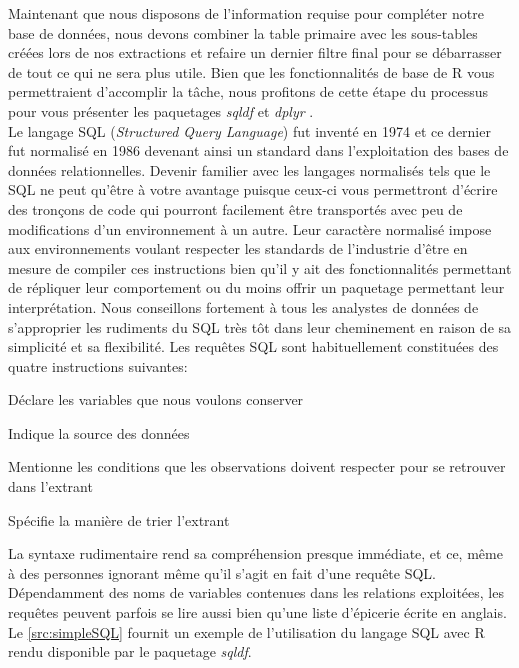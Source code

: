 \vspace{\baselineskip}
Maintenant que nous disposons de l'information requise pour compléter notre base de données, nous devons combiner la table primaire avec les sous-tables créées lors de nos extractions et refaire un dernier filtre final pour se débarrasser de tout ce qui ne sera plus utile. Bien que les fonctionnalités de base de R vous permettraient d'accomplir la tâche, nous profitons de cette étape du processus pour vous présenter les paquetages \emph{sqldf} \cite{Rpackage:sqldf} et \emph{dplyr} \cite{Rpackage:plyr}. \\

Le langage SQL (\emph{Structured Query Language}) fut inventé en 1974 et ce dernier fut normalisé en 1986 devenant ainsi un standard dans l'exploitation des bases de données relationnelles. Devenir familier avec les langages normalisés tels que le SQL ne peut qu'être à votre avantage puisque ceux-ci vous permettront d'écrire des tronçons de code qui pourront facilement être transportés avec peu de modifications d'un environnement à un autre. Leur caractère normalisé impose aux environnements voulant respecter les standards de l'industrie d'être en mesure de compiler ces instructions bien qu'il y ait des fonctionnalités permettant de répliquer leur comportement ou du moins offrir un paquetage permettant leur interprétation. \cite{SQL} Nous conseillons fortement à tous les analystes de données de s'approprier les rudiments du SQL très tôt dans leur cheminement en raison de sa simplicité et sa flexibilité. Les requêtes SQL sont habituellement constituées des quatre instructions suivantes: \\

\begin{description}[style=multiline,leftmargin=2cm]
	\item[Select] Déclare les variables que nous voulons conserver
	\item[From] Indique la source des données
	\item[Where] Mentionne les conditions que les observations doivent respecter pour se retrouver dans l'extrant
	\item[Order by] Spécifie la manière de trier l'extrant
\end{description}

La syntaxe rudimentaire rend sa compréhension presque immédiate, et ce, même à des personnes ignorant même qu'il s'agit en fait d'une requête SQL. Dépendamment des noms de variables contenues dans les relations exploitées, les requêtes peuvent parfois se lire aussi bien qu'une liste d'épicerie écrite en anglais. Le \autoref{src:simpleSQL} fournit un exemple de l'utilisation du langage SQL avec R rendu disponible par le paquetage \emph{sqldf}.

